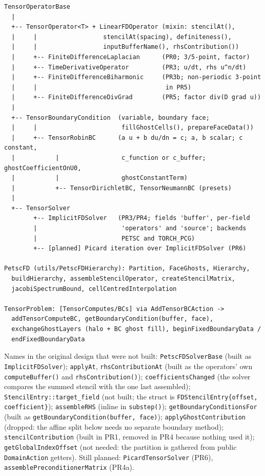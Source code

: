 \documentclass[11pt]{article}
\newenvironment{schematic}{%
  \begin{tcolorbox}[breakable, colback=codebg, colframe=gray!40, boxrule=0.4pt, arc=1mm, left=4mm, right=4mm, top=2mm, bottom=2mm]
  \ttfamily\footnotesize
}{%
  \end{tcolorbox}
}
\begin{document}
\begin{schematic}
\begin{verbatim}
TensorOperatorBase
  |
  +-- TensorOperator<T> + LinearFDOperator (mixin: stencilAt(),
  |     |                  stencilAt(spacing), definiteness(),
  |     |                  inputBufferName(), rhsContribution())
  |     +-- FiniteDifferenceLaplacian      (PR0; 3/5-point, factor)
  |     +-- TimeDerivativeOperator         (PR3; u/dt, rhs u^n/dt)
  |     +-- FiniteDifferenceBiharmonic     (PR3b; non-periodic 3-point
  |     |                                   in PR5)
  |     +-- FiniteDifferenceDivGrad        (PR5; factor div(D grad u))
  |
  +-- TensorBoundaryCondition  (variable, boundary face;
  |     |                       fillGhostCells(), prepareFaceData())
  |     +-- TensorRobinBC      (a u + b du/dn = c; a, b scalar; c constant,
  |           |                 c_function or c_buffer; ghostCoefficientOnU0,
  |           |                 ghostConstantTerm)
  |           +-- TensorDirichletBC, TensorNeumannBC (presets)
  |
  +-- TensorSolver
        +-- ImplicitFDSolver   (PR3/PR4; fields 'buffer', per-field
        |                       'operators' and 'source'; backends
        |                       PETSC and TORCH_PCG)
        +-- [planned] Picard iteration over ImplicitFDSolver (PR6)

PetscFD (utils/PetscFDHierarchy): Partition, FaceGhosts, Hierarchy,
  buildHierarchy, assembleStencilOperator, createStencilMatrix,
  jacobiSpectrumBound, cellCentredInterpolation

TensorProblem: [TensorComputes/BCs] via AddTensorBCAction ->
  addTensorComputeBC, getBoundaryCondition(buffer, face),
  exchangeGhostLayers (halo + BC ghost fill), beginFixedBoundaryData /
  endFixedBoundaryData
\end{verbatim}
\end{schematic}

Names in the original design that were not built: \texttt{PetscFDSolverBase}
(built as \texttt{ImplicitFDSolver}); \texttt{applyAt},
\texttt{rhsContributionAt} (built as the operators' own
\texttt{computeBuffer()} and \texttt{rhsContribution()});
\texttt{coefficientsChanged} (the solver compares the summed stencil with the
one last assembled); \texttt{StencilEntry::target\_field} (not built; the
struct is \texttt{FDStencilEntry\{offset, coefficient\}});
\texttt{assembleRHS} (inline in \texttt{substep()});
\texttt{getBoundaryConditionsFor} (built as
\texttt{getBoundaryCondition(buffer, face)});
\texttt{applyGhostContribution} (dropped: the affine split below needs no
separate boundary method); \texttt{stencilContribution} (built in PR1,
removed in PR4 because nothing used it); \texttt{getGlobalIndexOffset}
(not needed: the partition is gathered from public \texttt{DomainAction}
getters). Still planned: \texttt{PicardTensorSolver} (PR6),
\texttt{assemblePreconditionerMatrix}
(PR4a).
\end{document}
